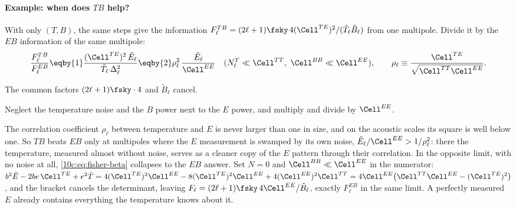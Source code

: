 \paragraph{Example: when does $TB$ help?} With only $(T,B)$, the same steps give the information
$F^{TB}_\ell=(2\ell+1)\fsky\,4(\Cell^{TE})^2/(\tilde T_\ell\tilde B_\ell)$ from one multipole. Divide it by the $EB$
information of the same multipole:
\begin{equation}
  \frac{F^{TB}_\ell}{F^{EB}_\ell}
  \eqby{1}\frac{(\Cell^{TE})^2\,\tilde E_\ell}{\tilde T_\ell\,\Delta_\ell^2}
  \eqby{2}\rho_\ell^2\,\frac{\tilde E_\ell}{\Cell^{EE}}\quad(N^T_\ell\ll\Cell^{TT},\ \Cell^{BB}\ll\Cell^{EE}),
  \qquad\rho_\ell\equiv\frac{\Cell^{TE}}{\sqrt{\Cell^{TT}\Cell^{EE}}} .
  \label{10c:eq:tb-eb}
\end{equation}
\begin{explain}
  \item The common factors $(2\ell+1)\fsky\cdot4$ and $\tilde B_\ell$ cancel.
  \item Neglect the temperature noise and the $B$ power next to the $E$ power, and multiply and divide by $\Cell^{EE}$.
\end{explain}
The correlation coefficient $\rho_\ell$ between temperature and $E$ is never larger than one in size, and on the
acoustic scales its square is well below one. So $TB$ beats $EB$ only at multipoles where the $E$ measurement is
swamped by its own noise, $\tilde E_\ell/\Cell^{EE}>1/\rho_\ell^2$: there the temperature, measured almost without noise,
serves as a cleaner copy of the $E$ pattern through their correlation. In the opposite limit, with no noise at all,
\eqref{10c:eq:fisher-beta} collapses to the $EB$ answer. Set $N=0$ and $\Cell^{BB}\ll\Cell^{EE}$ in the numerator:
$b^2\tilde E-2be\,\Cell^{TE}+e^2\tilde T=4(\Cell^{TE})^2\Cell^{EE}-8(\Cell^{TE})^2\Cell^{EE}+4(\Cell^{EE})^2\Cell^{TT}=4\Cell^{EE}\bigl(\Cell^{TT}\Cell^{EE}-(\Cell^{TE})^2\bigr)$, and the bracket
cancels the determinant, leaving $F_\ell=(2\ell+1)\fsky\,4\Cell^{EE}/\tilde B_\ell$, exactly $F^{EB}_\ell$ in the same limit.
A perfectly measured $E$ already contains everything the temperature knows about it.

